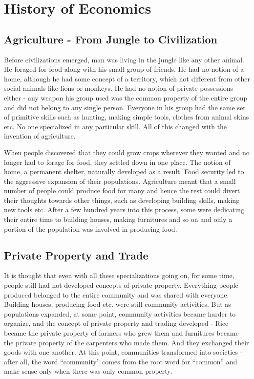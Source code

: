 \chapter{History of Economics}
\section{Agriculture - From Jungle to Civilization}
Before civilizations emerged, man was living in the jungle like any other animal. He foraged for food along with his small group of friends. He had no notion of a home, although he had some concept of a territory, which not different from other social animals like lions or monkeys. He had no notion of private possessions either - any weapon his group used was the common property of the entire group and did not belong to any single person. Everyone in his group had the same set of primitive skills such as hunting, making simple tools, clothes from animal skins etc. No one specialized in any particular skill. All of this changed with the invention of agriculture.

When people discovered that they could grow crops wherever they wanted and no longer had to forage for food, they settled down in one place. The notion of home, a permanent shelter, naturally developed as a result. Food security led to the aggressive expansion of their populations. Agriculture meant that a small number of people could produce food for many and hence the rest could divert their thoughts towards other things, such as developing building skills, making new tools etc. After a few hundred years into this process, some were dedicating their entire time to building houses, making furnitures and so on and only a portion of the population was involved in producing food.

\section{Private Property and Trade}
It is thought that even with all these specializations going on, for some time, people still had not developed concepts of private property. Everything people produced belonged to the entire community and was shared with everyone. Building houses, producing food etc. were still community activities. But as populations expanded, at some point, community activities became harder to organize, and the concept of private property and trading developed - Rice became the private property of farmers who grew them and furnitures became the private property of the carpenters who made them. And they exchanged their goods with one another. At this point, communities transformed into societies - after all, the word ``community'' comes from the root word for ``common'' and make sense only when there was only common property. 

